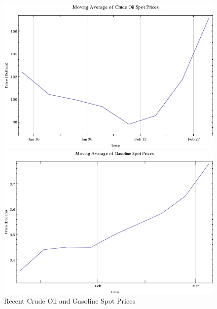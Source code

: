 \documentclass[11pt,twocolumn]{article}
\begin{document}
\begin{figure}
    \centering
    \includegraphics[scale=0.55]{images/RecentCrudePrices.png}\\
    \includegraphics[scale=0.5]{images/RecentGasPrices.png} \\
    {Recent Crude Oil and Gasoline Spot Prices}
\end{figure}
\end{document}
